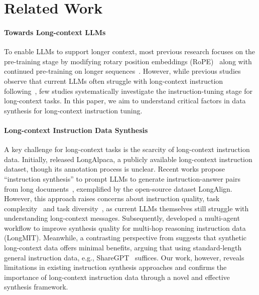 \section{Related Work}
\paragraph{Towards Long-context LLMs}
To enable LLMs to support longer context, most previous research focuses on the pre-training stage by modifying rotary position embeddings (RoPE)~\cite{su2024roformer, peng2024yarn} along with continued pre-training on longer sequences~\cite{chen2023extending,rozière2024codellama,chen2024longlora,peng2024yarn,xiong2024effective,fu2024data}.
However, while previous studies observe that current LLMs often struggle with long-context instruction following~\cite{shaham2023zeroscrolls}, few studies systematically investigate the instruction-tuning stage for long-context tasks.
In this paper, we aim to understand critical factors in data synthesis for long-context instruction tuning.

\noindent\paragraph{Long-context Instruction Data Synthesis}
A key challenge for long-context tasks is the scarcity of long-context instruction data.
Initially, \citet{chen2024longlora} released LongAlpaca, a publicly available long-context instruction dataset, though its annotation process is unclear.
Recent works propose ``instruction synthesis'' to prompt LLMs to generate instruction-answer pairs from long documents~\cite{bai2024longalign,xiong2024effective,dubey2024llama}, exemplified by the open-source dataset LongAlign.
However, this approach raises concerns about instruction quality, task complexity~\cite{chen2024essential} and task diversity~\cite{quan2024language}, as current LLMs themselves still struggle with understanding long-context messages.
Subsequently, \citet{chen2024essential} developed a multi-agent workflow to improve synthesis quality for multi-hop reasoning instruction data (LongMIT).
Meanwhile, a contrasting perspective from \citet{gao2024train} suggests that synthetic long-context data offers minimal benefits, arguing that using standard-length general instruction data, e.g., ShareGPT~\cite{chiang2023vicuna} suffices.
Our work, however, reveals limitations in existing instruction synthesis approaches and confirms the importance of long-context instruction data through a novel and effective synthesis framework.

